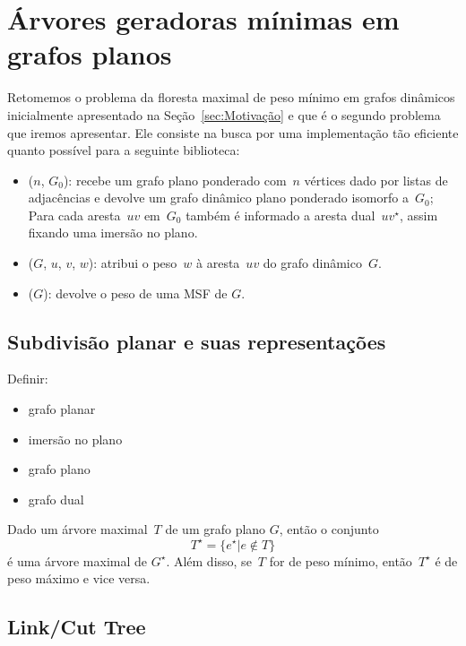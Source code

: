 \chapter{Árvores geradoras mínimas em grafos planos}
\label{sec:MSF}


Retomemos o problema da floresta maximal de peso mínimo em grafos dinâmicos inicialmente apresentado na Seção~\ref{sec:Motivação} e que é o segundo problema que iremos apresentar.
Ele consiste na busca por uma implementação tão eficiente quanto possível para a seguinte biblioteca:

\begin{itemize}
\item \MSFCreate($n$, $G_0$): recebe um grafo plano ponderado com~$n$ vértices dado por listas de adjacências e devolve um grafo dinâmico plano ponderado isomorfo a~$G_0$; Para cada aresta~$uv$ em~$G_0$ também é informado a aresta dual~$uv^\star$, assim fixando uma imersão no plano.
\item \MSFupdate($G$, $u$, $v$, $w$): atribui o peso~$w$ à aresta~$uv$ do grafo dinâmico~$G$.
\item \MSFweight($G$): devolve o peso de uma MSF de $G$.
\end{itemize}


\section{Subdivisão planar e suas representações}

Definir:
\begin{itemize}
\item grafo planar
\item imersão no plano
\item grafo plano
\item grafo dual
\end{itemize}

\begin{theorem}
\label{teo:MSFdual}
Dado um árvore maximal~$T$ de um grafo plano $G$, então o conjunto
$$
T^\star = \{e^\star|e\notin T\}
$$
é uma árvore maximal de $G^\star$.
Além disso, se~$T$ for de peso mínimo, então~$T^\star$ é de peso máximo e vice versa.
\end{theorem}

\section{Link/Cut Tree}
\label{sec:linkcuttree}

